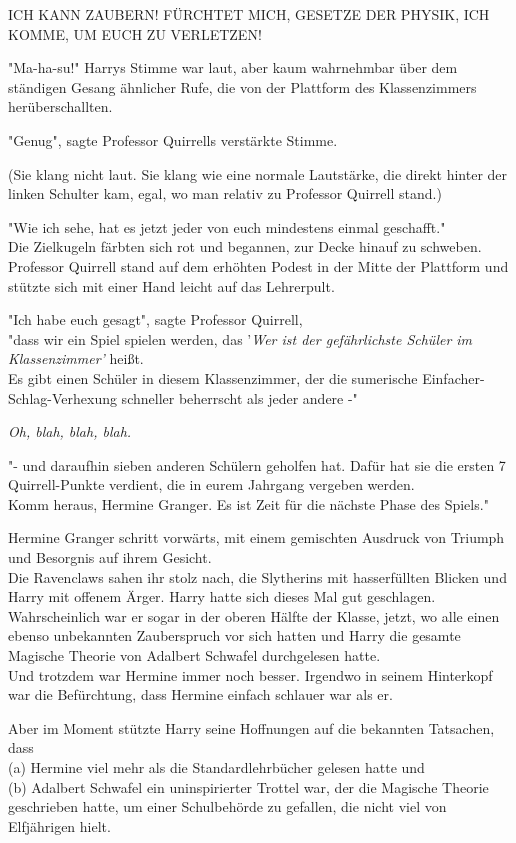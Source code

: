 {ICH KANN ZAUBERN! FÜRCHTET MICH, GESETZE DER PHYSIK, ICH KOMME, UM EUCH ZU VERLETZEN!

"Ma-ha-su!" Harrys Stimme war laut, aber kaum wahrnehmbar über dem ständigen Gesang ähnlicher Rufe, die von der Plattform des Klassenzimmers herüberschallten.

"Genug", sagte Professor Quirrells verstärkte Stimme.

(Sie klang nicht laut. Sie klang wie eine normale Lautstärke, die direkt hinter der linken Schulter kam, egal, wo man relativ zu Professor Quirrell stand.)

"Wie ich sehe, hat es jetzt jeder von euch mindestens einmal geschafft."\\ Die Zielkugeln färbten sich rot und begannen, zur Decke hinauf zu schweben.\\ Professor Quirrell stand auf dem erhöhten Podest in der Mitte der Plattform und stützte sich mit einer Hand leicht auf das Lehrerpult.

"Ich habe euch gesagt", sagte Professor Quirrell,\\ "dass wir ein Spiel spielen werden, das '\emph{Wer ist der gefährlichste Schüler im Klassenzimmer'} heißt.\\ Es gibt einen Schüler in diesem Klassenzimmer, der die sumerische Einfacher-Schlag-Verhexung schneller beherrscht als jeder andere -"

\emph{Oh, blah, blah, blah.}

"- und daraufhin sieben anderen Schülern geholfen hat. Dafür hat sie die ersten 7 Quirrell-Punkte verdient, die in eurem Jahrgang vergeben werden.\\ Komm heraus, Hermine Granger. Es ist Zeit für die nächste Phase des Spiels."

Hermine Granger schritt vorwärts, mit einem gemischten Ausdruck von Triumph und Besorgnis auf ihrem Gesicht.\\ Die Ravenclaws sahen ihr stolz nach, die Slytherins mit hasserfüllten Blicken und Harry mit offenem Ärger. Harry hatte sich dieses Mal gut geschlagen.\\ Wahrscheinlich war er sogar in der oberen Hälfte der Klasse, jetzt, wo alle einen ebenso unbekannten Zauberspruch vor sich hatten und Harry die gesamte Magische Theorie von Adalbert Schwafel durchgelesen hatte.\\ Und trotzdem war Hermine immer noch besser. Irgendwo in seinem Hinterkopf war die Befürchtung, dass Hermine einfach schlauer war als er.

Aber im Moment stützte Harry seine Hoffnungen auf die bekannten Tatsachen, dass\\ (a) Hermine viel mehr als die Standardlehrbücher gelesen hatte und\\ (b) Adalbert Schwafel ein uninspirierter Trottel war, der die Magische Theorie geschrieben hatte, um einer Schulbehörde zu gefallen, die nicht viel von Elfjährigen hielt.

}
